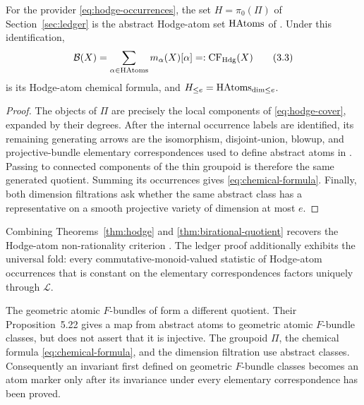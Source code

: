 \begin{theorem}
\label{thm:hodge}
For the provider \eqref{eq:hodge-occurrences}, the set
\(H=\pi_0(\Pi)\) of Section~\ref{sec:ledger} is the abstract Hodge-atom set
\(\operatorname{HAtoms}\) of \cite[Definition~5.16 and Section~5.4]{KKPY}.  Under this
identification,
\[
 \mathcal B(X)=\sum_{\alpha\in\operatorname{HAtoms}}m_\alpha(X)[\alpha]
 =:\operatorname{CF}_{\mathrm{Hdg}}(X)
 \tag{3.3}\label{eq:chemical-formula}
\]
is its Hodge-atom chemical formula, and
\(H_{\le e}=\operatorname{HAtoms}_{\dim\le e}\).
\end{theorem}

\begin{proof}
The objects of \(\Pi\) are precisely the local components of
\eqref{eq:hodge-cover}, expanded by their degrees.  After the internal
occurrence labels are identified, its remaining generating arrows are the
isomorphism, disjoint-union, blowup, and projective-bundle elementary
correspondences used to define abstract atoms in
\cite[Sections~5.2.3--5.2.6]{KKPY}.  Passing to connected components of the
thin groupoid is therefore the same generated quotient.  Summing its
occurrences gives \eqref{eq:chemical-formula}.  Finally, both dimension
filtrations ask whether the same abstract class has a representative on a
smooth projective variety of dimension at most $e$.
\end{proof}

Combining Theorems~\ref{thm:hodge} and
\ref{thm:birational-quotient} recovers the Hodge-atom non-rationality
criterion \cite[Proposition~5.30]{KKPY}.  The ledger proof additionally
exhibits the universal fold: every commutative-monoid-valued statistic of
Hodge-atom occurrences that is constant on the elementary correspondences
factors uniquely through \(\mathcal L\).

\begin{remark}
\label{rem:two-quotients}
The geometric atomic $F$-bundles of \cite[Definition~5.21]{KKPY} form a
different quotient.  Their Proposition~5.22 gives a map from abstract atoms
to geometric atomic $F$-bundle classes, but does not assert that it is
injective.  The groupoid \(\Pi\), the chemical formula
\eqref{eq:chemical-formula}, and the dimension filtration use abstract
classes.  Consequently an invariant first defined on geometric $F$-bundle
classes becomes an atom marker only after its invariance under every
elementary correspondence has been proved.
\end{remark}
